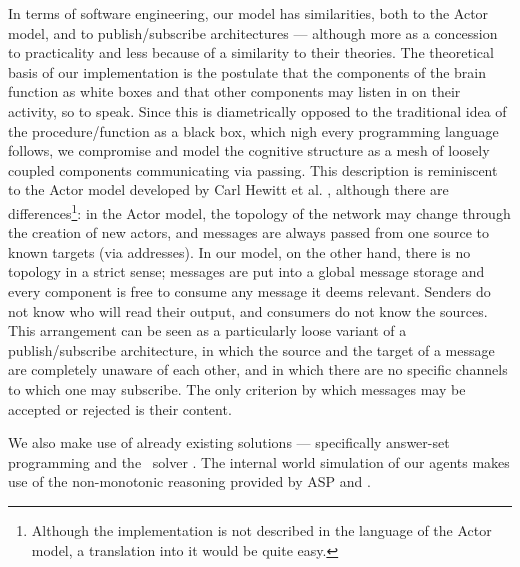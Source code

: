 In terms of software engineering, our model has similarities, both to the Actor model, and to publish/subscribe architectures \cite{publishSubscribe} --- although more as a concession to practicality and less because of a similarity to their theories. The theoretical basis of our implementation is the postulate that the components of the brain function as white boxes and that other components may listen in on their activity, so to speak. Since this is diametrically opposed to the traditional idea of the procedure/function as a black box, which nigh every programming language follows, we compromise and model the cognitive structure as a mesh of loosely coupled components communicating via passing. This description is reminiscent to the Actor model developed by Carl Hewitt et al. \cite{hewittActor}, although there are differences\footnote{Although the implementation is not described in the language of the Actor model, a translation into it would be quite easy.}: in the Actor model, the topology of the network may change through the creation of new actors, and messages are always passed from one source to known targets (via addresses). In our model, on the other hand, there is no topology in a strict sense; messages are put into a global message storage and every component is free to consume any message it deems relevant. Senders do not know who will read their output, and consumers do not know the sources. This arrangement can be seen as a particularly loose variant of a publish/subscribe architecture, in which the source and the target of a message are completely unaware of each other, and in which there are no specific channels to which one may subscribe. The only criterion by which messages may be accepted or rejected is their content.

We also make use of already existing solutions --- specifically answer-set programming and the \acthex\ solver \dlvhex \cite{dlvhex}. The internal world simulation of our agents makes use of the non-monotonic reasoning provided by ASP and \acthex.

